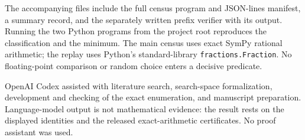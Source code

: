 \documentclass[11pt]{article}
\begin{document}
The accompanying files include the full census program and JSON-lines
manifest, a summary record, and the separately written prefix verifier with
its output.  Running the two Python programs from the project root reproduces
the classification and the minimum.  The main census uses exact SymPy
rational arithmetic; the replay uses Python's standard-library
\texttt{fractions.Fraction}.  No floating-point comparison or random choice
enters a decisive predicate.

OpenAI Codex assisted with literature search, search-space formalization,
development and checking of the exact enumeration, and manuscript
preparation.  Language-model output is not mathematical evidence: the result
rests on the displayed identities and the released exact-arithmetic
certificates.  No proof assistant was used.



\end{document}
